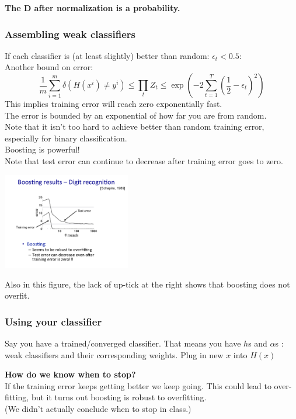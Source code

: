\textbf{The D after normalization is a probability.}

\subsubsection{Assembling weak classifiers}
If each classifier is (at least slightly) better than random: $\epsilon_t < 0.5$: \hfill \\
Another bound on error:
$$ \frac{1}{m} \sum_{i=1}^m \delta (H(x^i) \neq y^i) \leq \prod_t Z_t \leq \exp \left( -2 \sum_{t=1}^T (\frac{1}{2} - \epsilon_t)^2 \right)$$
This implies training error will reach zero exponentially fast. \hfill \\
The error is bounded by an exponential of how far you are from random. \hfill \\

Note that it isn't too hard to achieve better than random training error, especially for binary classification.   \hfill \\
Boosting is powerful!  \hfill \\

Note that test error can continue to decrease after training error goes to zero.  

\includegraphics[width=2.2in]{figures/boosting_train_test_error.pdf}

Also in this figure, the lack of up-tick at the right shows that boosting does not overfit. 

\subsubsection{Using your classifier}
Say you have a trained/converged classifier.
That means you have $h$s and $\alpha$s : weak classifiers and their corresponding weights. 
Plug in new $x$ into $H(x)$ %

\textbf{How do we know when to stop? } \hfill \\
If the training error keeps getting better we keep going.
This could lead to over-fitting, but it turns out boosting is robust to overfitting.   \hfill \\
(We didn't actually conclude when to stop in class.) 

